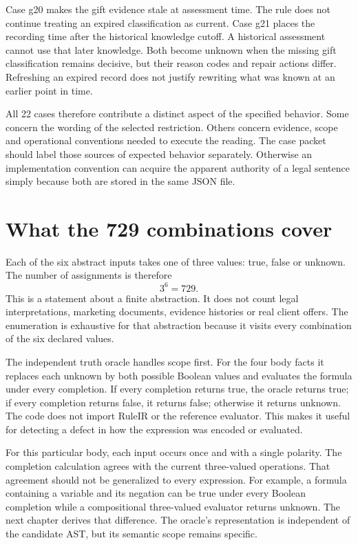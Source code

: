 Case g20 makes the gift evidence stale at assessment time. The rule does not
continue treating an expired classification as current. Case g21 places the
recording time after the historical knowledge cutoff. A historical assessment
cannot use that later knowledge. Both become unknown when the missing gift
classification remains decisive, but their reason codes and repair actions
differ. Refreshing an expired record does not justify rewriting what was known
at an earlier point in time.

All 22 cases therefore contribute a distinct aspect of the specified behavior.
Some concern the wording of the selected restriction. Others concern evidence,
scope and operational conventions needed to execute the reading. The case
packet should label those sources of expected behavior separately. Otherwise
an implementation convention can acquire the apparent authority of a legal
sentence simply because both are stored in the same JSON file.

\section{What the 729 combinations cover}
\label{sec:circular-enumeration}
Each of the six abstract inputs takes one of three values: true, false or
unknown. The number of assignments is therefore
\begin{equation}
 3^6=729.
 \label{eq:case-domain-size}
\end{equation}
This is a statement about a finite abstraction. It does not count legal
interpretations, marketing documents, evidence histories or real client offers.
The enumeration is exhaustive for that abstraction because it visits every
combination of the six declared values.

The independent truth oracle handles scope first. For the four body facts it
replaces each unknown by both possible Boolean values and evaluates the formula
under every completion. If every completion returns true, the oracle returns
true; if every completion returns false, it returns false; otherwise it returns
unknown. The code does not import RuleIR or the reference evaluator. This makes
it useful for detecting a defect in how the expression was encoded or evaluated.

For this particular body, each input occurs once and with a single polarity.
The completion calculation agrees with the current three-valued operations.
That agreement should not be generalized to every expression. For example, a
formula containing a variable and its negation can be true under every Boolean
completion while a compositional three-valued evaluator returns unknown. The
next chapter derives that difference. The oracle's representation is independent
of the candidate AST, but its semantic scope remains specific.

